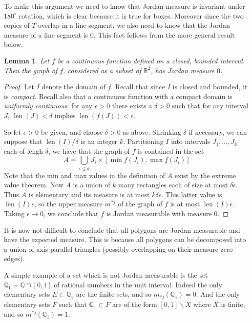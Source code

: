 \documentclass[11pt,oneside]{amsbook}
\renewcommand{\setminus}{\smallsetminus}
\newcommand{\QQ}{{\mathbb Q}}
\newcommand{\RR}{{\mathbb R}}
\DeclareMathOperator{\len}{len}
\theoremstyle{definition}
\theoremstyle{plain}
\newtheorem{lem}[thm]{Lemma}
\theoremstyle{definition}
\theoremstyle{remark}
\numberwithin{equation}{section}
\numberwithin{figure}{section}
\begin{document}
To make this argument we need to know that Jordan measure is invariant under $180^\circ$ rotation, which is clear because it is true for boxes. Moreover since the two copies of $T$ overlap in a line segment, we also need to know that the Jordan measure of a line segment is $0$. This fact follows from the more general result below.


\begin{lem}
  \label{lem:jordan-graph}
  Let $f$ be a continuous function defined on a closed, bounded interval. Then the graph of $f$, considered as a subset of $\RR^2$, has Jordan measure $0$.
\end{lem}

\begin{proof}
  Let $I$ denote the domain of $f$. Recall that since $I$ is closed and bounded, it is \emph{compact}. Recall also that a continuous function with a compact domain is \emph{uniformly continuous}: for any $\epsilon>0$ there exists a $\delta>0$ such that for any interval $J$, $\len(J)<\delta$ implies $\len(f(J))<\epsilon$.

  So let $\epsilon>0$ be given, and choose $\delta>0$ as above. Shrinking $\delta$ if necessary, we can suppose that $\len(I)/\delta$ is an integer $k$. Partitioning $I$ into intervals $J_1,\ldots,J_k$ each of lengh $\delta$, we have that the graph of $f$ is contained in the set
  \[A=\bigcup_{i\leq k} J_i\times[\min f(J_i),\max f(J_i)]
  \]
  Note that the min and max values in the definition of $A$ exist by the extreme value theorem. Now $A$ is a union of $k$ many rectangles each of size at most $\delta\epsilon$. Thus $A$ is elementary and its measure is at most $k\delta\epsilon$. This latter value is $\len(I)\epsilon$, so the upper measure $m^{*j}$ of the graph of $f$ is at most $\len(I)\epsilon$. Taking $\epsilon\to0$, we conclude that $f$ is Jordan measurable with measure $0$.
\end{proof}

It is now not difficult to conclude that all polygons are Jordan measurable and have the expected measure. This is because all polygons can be decomposed into a union of axis parallel triangles (possibly overlapping on their measure zero edges).

A simple example of a set which is not Jordan measurable is the set $\QQ_1=\QQ\cap[0,1]$ of rational numbers in the unit interval. Indeed the only elementary sets $E\subset\QQ_1$ are the finite sets, and so $m_{*j}(\QQ_1)=0$. And the only elementary sets $F$ such that $\QQ_1\subset F$ are of the form $[0,1]\setminus X$ where $X$ is finite, and so $m^{*j}(\QQ_1)=1$.
\end{document}
